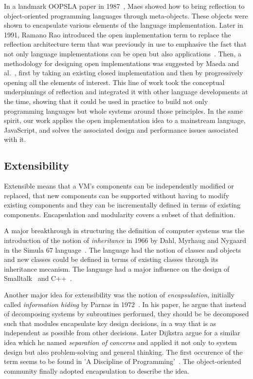 In a landmark OOPSLA paper in 1987~\cite{Maes:1987}, Maes showed how to
bring reflection to object-oriented programming languages through meta-objects.
These objects were shown to encapsulate various elements of the language
implementation. Later in 1991, Ramano Rao introduced the open implementation
term to replace the reflection architecture term that was previously in use to
emphasive the fact that not only language implementations can be open but also
applications~\cite{Rao:1991}. Then, a methodology for designing open
implementations was suggested by Maeda and al.~\cite{Maeda:1997}, first by
taking an existing closed implementation and then by progressively opening all
the elements of interest. This line of work took the conceptual underpinnings
of reflection and integrated it with other language developments at the time,
showing that it could be used in practice to build not only programming
languages but whole systems around those principles. In the same spirit, our
work applies the open implementation idea to a mainstream language, JavaScript,
and solves the associated design and performance issues associated with it.

\subsection{Extensibility}

Extensible means that a VM's components can be independently modified or
replaced, that new components can be supported without having to modify
existing components and they can be incrementally defined in terms of existing
components. Encapsulation and modularity covers a subset of that definition. 

A major breakthrough in structuring the definition of computer systems was the
introduction of the notion of \textit{inheritance} in 1966 by Dahl, Myrhaug and
Nygaard in the Simula 67 language~\cite{Dahl:1968}. The language had the notion
of classes and objects and new classes could be defined in terms of existing
classes through its inheritance mecanism. The language had a major influence on
the design of Smalltalk~\cite{Kay:1993} and C++~\cite{Stroustrup:2007}.

Another major idea for extensibility was the notion of \textit{encapsulation},
initially called \textit{information hiding} by Parnas in
1972~\cite{Parnas:1972}. In his paper, he argue that instead of decomposing
systems by subroutines performed, they should be be decomposed such that modules
encapsulate key design decisions, in a way that is as independent as possible
from other decisions.  Later Dijkstra argue for a similar idea which he named
\textit{separation of concerns} and applied it not only to system design but
also problem-solving and general thinking. The first occurence of the term
seems to be found in 'A Discipline of Programming'~\cite{dijkstra:1976}. The
object-oriented community finally adopted encapsulation to describe the idea.

